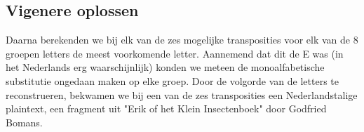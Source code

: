 \subsection{Vigenere oplossen}
Daarna berekenden we bij elk van de zes mogelijke transposities voor elk van de 8 groepen letters de meest voorkomende letter. Aannemend dat dit de E was (in het Nederlands erg waarschijnlijk) konden we meteen de monoalfabetische substitutie ongedaan maken op elke groep. Door de volgorde van de letters te reconstrueren, bekwamen we bij een van de zes transposities een Nederlandstalige plaintext, een fragment uit "Erik of het Klein Insectenboek" door Godfried Bomans.


